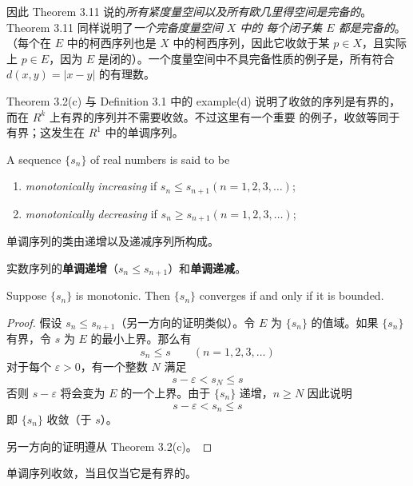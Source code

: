 \documentclass[../poma-notes.tex]{subfiles}
\begin{document}
因此 Theorem 3.11 说的\textit{所有紧度量空间以及所有欧几里得空间是完备的}。Theorem 3.11 同样说明了\textit{一个完备度量空间 $X$ 中的
  每个闭子集 $E$ 都是完备的}。（每个在 $E$ 中的柯西序列也是 $X$ 中的柯西序列，因此它收敛于某 $p \in X$，且实际上 $p \in E$，因为 $E$
是闭的）。一个度量空间中不具完备性质的例子是，所有符合 $d(x,y) = |x - y|$ 的有理数。

Theorem 3.2(c) 与 Definition 3.1 中的 example(d) 说明了收敛的序列是有界的，而在 $R^k$ 上有界的序列并不需要收敛。不过这里有一个重要
的例子，收敛等同于有界；这发生在 $R^1$ 中的单调序列。

\begin{definition}
  A sequence $\{s_n\}$ of real numbers is said to be
  \begin{enumerate}[label=(\alph*)]
    \item \textit{monotonically increasing} if $s_n \le s_{n+1} (n=1,2,3,\dots)$;
    \item \textit{monotonically decreasing} if $s_n \ge s_{n+1} (n=1,2,3,\dots)$;
  \end{enumerate}
\end{definition}

单调序列的类由递增以及递减序列所构成。

\anote 实数序列的\textbf{单调递增}（$s_n \le s_{n+1}$）和\textbf{单调递减}。

\begin{theorem}
  Suppose $\{s_n\}$ is monotonic. Then $\{s_n\}$ converges if and only if it is bounded.
\end{theorem}

\begin{proof}
  假设 $s_n \le s_{n+1}$（另一方向的证明类似）。令 $E$ 为 $\{s_n\}$ 的值域。如果 $\{s_n\}$ 有界，令 $s$ 为 $E$ 的最小上界。那么有
  \[ s_n \le s \qquad (n=1,2,3,\dots) \]
  对于每个 $\varepsilon > 0$，有一个整数 $N$ 满足
  \[ s - \varepsilon < s_N \le s \]
  否则 $s - \varepsilon$ 将会变为 $E$ 的一个上界。由于 $\{s_n\}$ 递增，$n \ge N$ 因此说明
  \[ s - \varepsilon < s_n \le s \]
  即 $\{s_n\}$ 收敛（于 $s$）。

  另一方向的证明遵从 Theorem 3.2(c)。
\end{proof}

\anote 单调序列收敛，当且仅当它是有界的。
\end{document}

